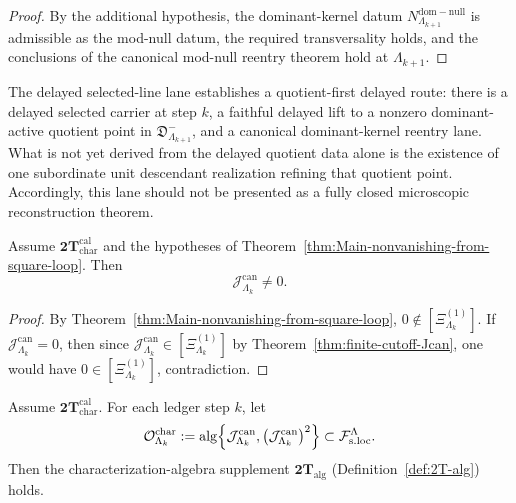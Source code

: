\begin{proof}
By the additional hypothesis, the dominant-kernel datum
\(
N^{\mathrm{dom-null}}_{\Lambda_{k+1}}
\)
is admissible as the mod-null datum, the required transversality holds,
and the conclusions of the canonical mod-null reentry theorem hold at \(\Lambda_{k+1}\).
\end{proof}

\begin{remark}
\label{rem:Main-delayed-boundary}
The delayed selected-line lane establishes a quotient-first delayed route:
there is a delayed selected carrier at step \(k\), a faithful delayed lift to a nonzero dominant-active
quotient point in
\(\mathfrak D^-_{\Lambda_{k+1}}\),
and a canonical dominant-kernel reentry lane.
What is not yet derived from the delayed quotient data alone is the existence
of one subordinate unit descendant realization refining that quotient point.
Accordingly, this lane should not be presented as a
fully closed microscopic reconstruction theorem.
\end{remark}

\begin{corollary}
\label{cor:Jcan-nonzero-from-class}
Assume \(\mathbf{2T}_{\mathrm{char}}^{\mathrm{cal}}\) and the hypotheses of
Theorem~\ref{thm:Main-nonvanishing-from-square-loop}. Then
\[
\mathcal J^{\mathrm{can}}_{\Lambda_k}\neq 0.
\]
\end{corollary}

\begin{proof}
By Theorem~\ref{thm:Main-nonvanishing-from-square-loop},
\(
0\notin[\Xi^{(1)}_{\Lambda_k}]
\).
If \(\mathcal J^{\mathrm{can}}_{\Lambda_k}=0\), then since
\(
\mathcal J^{\mathrm{can}}_{\Lambda_k}\in[\Xi^{(1)}_{\Lambda_k}]
\)
by Theorem~\ref{thm:finite-cutoff-Jcan}, one would have
\(
0\in[\Xi^{(1)}_{\Lambda_k}]
\), contradiction.
\end{proof}

\begin{theorem}
\label{thm:char-cal-to-alg}
Assume \(\mathbf{2T}_{\mathrm{char}}^{\mathrm{cal}}\). For each ledger step \(k\), let
\[
\mathcal O^{\mathrm{char}}_{\Lambda_k}
:=
\mathrm{alg}\Bigl\{\mathcal J^{\mathrm{can}}_{\Lambda_k},
\bigl(\mathcal J^{\mathrm{can}}_{\Lambda_k}\bigr)^2\Bigr\}
\subset \mathcal F_{\mathrm{s.loc}}^\Lambda.
\]
Then the characterization-algebra supplement
\(\mathbf{2T}_{\mathrm{alg}}\) \textnormal{(Definition~\ref{def:2T-alg})} holds.
\end{theorem}

